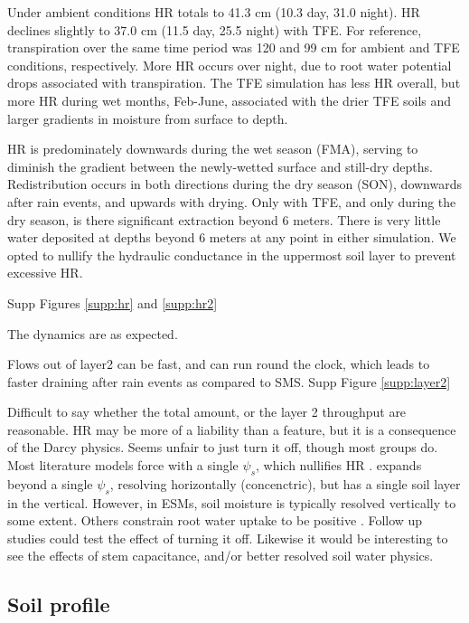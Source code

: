 \documentclass[draft,linenumbers]{agujournal}
\begin{document}
Under ambient conditions HR totals to 41.3 cm (10.3 day, 31.0 night). 
HR declines slightly to 37.0 cm (11.5 day, 25.5 night) with TFE.
For reference, transpiration over the same time period was 120 and 99 cm for ambient and TFE conditions, respectively.
More HR occurs over night, due to root water potential drops associated with transpiration.
The TFE simulation has less HR overall, but more HR during wet months, Feb-June, 
associated with the drier TFE soils and larger gradients in moisture from surface to depth.

HR is predominately downwards during the wet season (FMA), serving to diminish the gradient between the newly-wetted surface and still-dry depths.
Redistribution occurs in both directions during the dry season (SON), downwards after rain events, and upwards with drying.
Only with TFE, and only during the dry season, is there significant extraction beyond 6 meters.
There is very little water deposited at depths beyond 6 meters at any point in either simulation.
We opted to nullify the hydraulic conductance in the uppermost soil layer to prevent excessive HR.


Supp Figures \ref{supp:hr} and \ref{supp:hr2}

The dynamics are as expected.

Flows out of layer2 can be fast, and can run round the clock, which leads to faster draining after rain events as compared to SMS.
Supp Figure \ref{supp:layer2}

Difficult to say whether the total amount, or the layer 2 throughput are reasonable.
HR may be more of a liability than a feature, but it is a consequence of the Darcy physics.
Seems unfair to just turn it off, though most groups do.
Most literature models force with a single $\psi_s$, which nullifies HR \citep{fisher2007,bonan2014,sperry2017}.
\cite{christoffersen2016} expands beyond a single $\psi_s$, resolving horizontally (concenctric), but has a single soil layer in the vertical.
However, in ESMs, soil moisture is typically resolved vertically to some extent.
Others constrain root water uptake to be positive \citep{xu2016}.
Follow up studies could test the effect of turning it off.
Likewise it would be interesting to see the effects of stem capacitance, and/or better resolved soil water physics.


\subsection{Soil profile}
\end{document}
